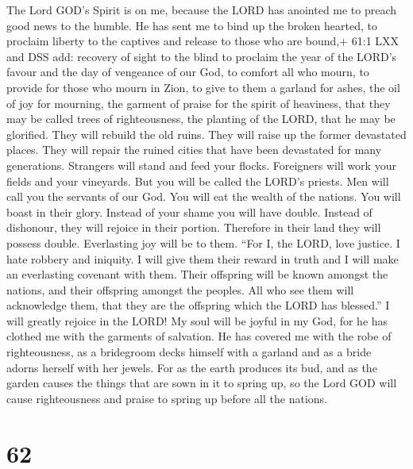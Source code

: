  The Lord GOD's Spirit is on me, because the LORD has
anointed me to preach good news to the humble. He has sent me to bind up
the broken hearted, to proclaim liberty to the captives and release to
those who are bound,+ 61:1 LXX and DSS add: recovery of sight to the
blind  to proclaim the year of the LORD's favour and the day
of vengeance of our God, to comfort all who mourn,  to
provide for those who mourn in Zion, to give to them a garland for
ashes, the oil of joy for mourning, the garment of praise for the spirit
of heaviness, that they may be called trees of righteousness, the
planting of the LORD, that he may be glorified.  They will
rebuild the old ruins. They will raise up the former devastated places.
They will repair the ruined cities that have been devastated for many
generations.  Strangers will stand and feed your flocks.
Foreigners will work your fields and your vineyards.  But
you will be called the LORD's priests. Men will call you the servants of
our God. You will eat the wealth of the nations. You will boast in their
glory.  Instead of your shame you will have double. Instead
of dishonour, they will rejoice in their portion. Therefore in their
land they will possess double. Everlasting joy will be to them.
 ``For I, the LORD, love justice. I hate robbery and
iniquity. I will give them their reward in truth and I will make an
everlasting covenant with them.  Their offspring will be
known amongst the nations, and their offspring amongst the peoples. All
who see them will acknowledge them, that they are the offspring which
the LORD has blessed.''  I will greatly rejoice in the
LORD! My soul will be joyful in my God, for he has clothed me with the
garments of salvation. He has covered me with the robe of righteousness,
as a bridegroom decks himself with a garland and as a bride adorns
herself with her jewels.  For as the earth produces its
bud, and as the garden causes the things that are sown in it to spring
up, so the Lord GOD will cause righteousness and praise to spring up
before all the nations.

\hypertarget{section-58}{%
\section{62}\label{section-58}}

